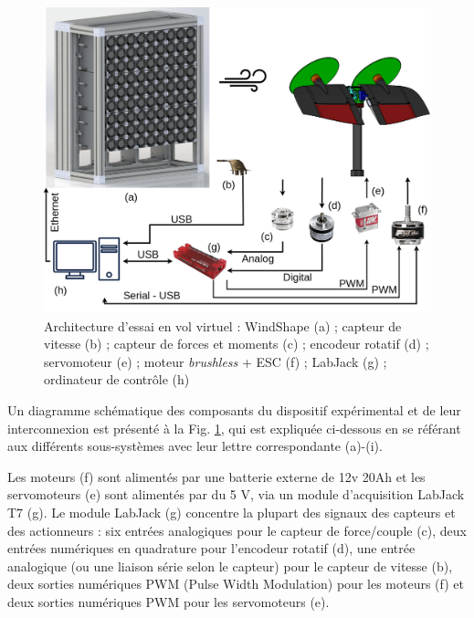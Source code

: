 \begin{figure}[!ht]
    \includegraphics[width=\columnwidth]{figures/maquette-min.png}
    \caption{Architecture d'essai en vol virtuel : WindShape (a) ; capteur de vitesse (b) ; capteur de forces et moments (c) ; encodeur rotatif (d) ; servomoteur (e) ; moteur \textit{brushless} + ESC (f) ; LabJack (g) ; ordinateur de contrôle (h)}
    \label{fig:archi}
\end{figure}
Un diagramme schématique des composants du dispositif expérimental et de leur interconnexion est présenté à la Fig. \ref{fig:archi}, qui est expliquée ci-dessous en se référant aux différents sous-systèmes avec leur lettre correspondante (a)-(i).

Les moteurs (f) sont alimentés par une batterie externe de 12v 20Ah et les servomoteurs (e) sont alimentés par du 5 V, via un module d'acquisition LabJack T7 \cite[]{LabJack} (g). Le module LabJack (g) concentre la plupart des signaux des capteurs et des actionneurs : six entrées analogiques pour le capteur de force/couple (c), deux entrées numériques en quadrature pour l'encodeur rotatif (d), une entrée analogique (ou une liaison série selon le capteur) pour le capteur de vitesse (b), deux sorties numériques PWM (Pulse Width Modulation)  pour les moteurs (f) et deux sorties numériques PWM pour les servomoteurs (e). 


